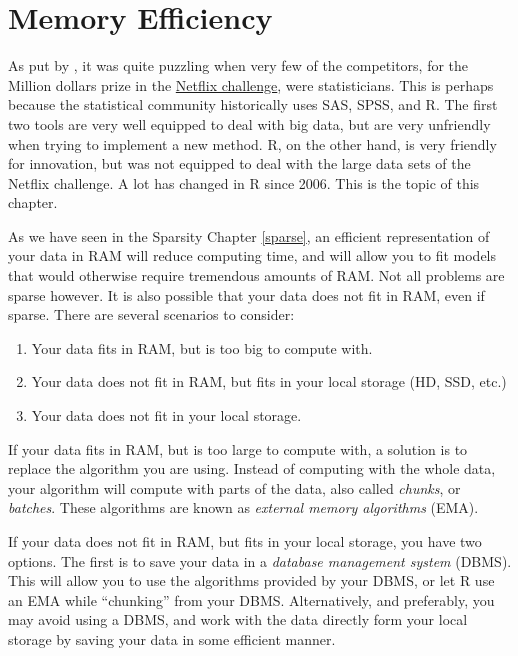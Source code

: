 \documentclass[]{book}
\providecommand{\tightlist}{%
  \setlength{\itemsep}{0pt}\setlength{\parskip}{0pt}}
\theoremstyle{definition}
\theoremstyle{definition}
\theoremstyle{definition}
\theoremstyle{remark}
\begin{document}
\chapter{Memory Efficiency}\label{memory}

As put by \citet{kane2013scalable}, it was quite puzzling when very few
of the competitors, for the Million dollars prize in the
\href{https://en.wikipedia.org/wiki/Netflix_Prize}{Netflix challenge},
were statisticians. This is perhaps because the statistical community
historically uses SAS, SPSS, and R. The first two tools are very well
equipped to deal with big data, but are very unfriendly when trying to
implement a new method. R, on the other hand, is very friendly for
innovation, but was not equipped to deal with the large data sets of the
Netflix challenge. A lot has changed in R since 2006. This is the topic
of this chapter.

As we have seen in the Sparsity Chapter \ref{sparse}, an efficient
representation of your data in RAM will reduce computing time, and will
allow you to fit models that would otherwise require tremendous amounts
of RAM. Not all problems are sparse however. It is also possible that
your data does not fit in RAM, even if sparse. There are several
scenarios to consider:

\begin{enumerate}
\def\labelenumi{\arabic{enumi}.}
\tightlist
\item
  Your data fits in RAM, but is too big to compute with.
\item
  Your data does not fit in RAM, but fits in your local storage (HD,
  SSD, etc.)
\item
  Your data does not fit in your local storage.
\end{enumerate}

If your data fits in RAM, but is too large to compute with, a solution
is to replace the algorithm you are using. Instead of computing with the
whole data, your algorithm will compute with parts of the data, also
called \emph{chunks}, or \emph{batches}. These algorithms are known as
\emph{external memory algorithms} (EMA).

If your data does not fit in RAM, but fits in your local storage, you
have two options. The first is to save your data in a \emph{database
management system} (DBMS). This will allow you to use the algorithms
provided by your DBMS, or let R use an EMA while ``chunking'' from your
DBMS. Alternatively, and preferably, you may avoid using a DBMS, and
work with the data directly form your local storage by saving your data
in some efficient manner.
\end{document}
